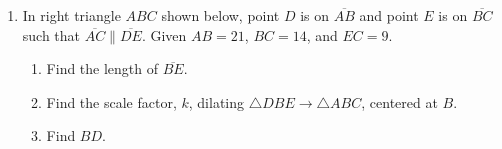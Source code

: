 \documentclass[12pt, twoside]{article}
\begin{document}
\begin{enumerate}
  \item In right triangle $ABC$ shown below, point $D$ is on $\overline{AB}$ and point $E$ is on $\overline{BC}$ such that $\overline{AC} \parallel \overline{DE}$. Given $AB=21$, $BC=14$, and $EC=9$.
    \begin{center}
    \end{center}
   \begin{enumerate}
     \item Find the length of $\overline{BE}$. \vspace{0.5cm}
     \item Find the scale factor, $k$, dilating $\triangle DBE \rightarrow \triangle ABC$, centered at $B$. \vspace{1.5cm}
     \item Find $BD$.
    \end{enumerate}

\end{enumerate}


  
\end{document}
